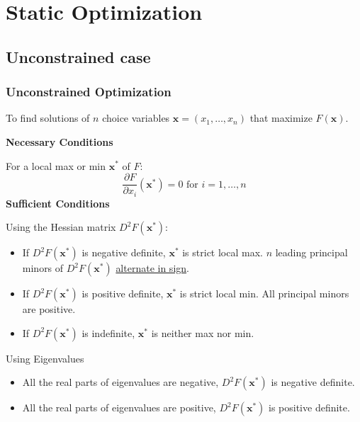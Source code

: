 \documentclass[
10pt, %
]{beamer}
\begin{document}
\section{Static Optimization}
\subsection{Unconstrained case}
\begin{frame}
\frametitle{Unconstrained Optimization}

To find solutions of $n$ choice variables $\mathbf{x} = (x_1, \dots, x_n)$ that maximize $F(\mathbf{x})$.

\textbf{Necessary Conditions}

For a local max or min $\mathbf{x}^*$ of $F$:
\[
\frac{\partial F}{\partial x_i} (\mathbf{x}^*) = 0 \text{ for } i = 1, \dots, n
\]
\textbf{Sufficient Conditions}

Using the Hessian matrix $D^2 F(\mathbf{x}^*)$:
\begin{itemize}
\item If $D^2 F(\mathbf{x}^*)$ is negative definite, $\mathbf{x}^*$ is strict local max. $n$ leading principal minors of $D^2 F(\mathbf{x}^*)$ \underline{alternate in sign}.
\item If $D^2 F(\mathbf{x}^*)$ is positive definite, $\mathbf{x}^*$ is strict local min. All principal minors are positive.
\item If $D^2 F(\mathbf{x}^*)$ is indefinite, $\mathbf{x}^*$ is neither max nor min.
\end{itemize}

Using Eigenvalues
\begin{itemize}
	\item All the real parts of eigenvalues are negative, $D^2 F(\mathbf{x}^*)$ is negative definite.
	\item All the real parts of eigenvalues are positive, $D^2 F(\mathbf{x}^*)$ is positive definite.
\end{itemize}
\end{frame}
\end{document}
